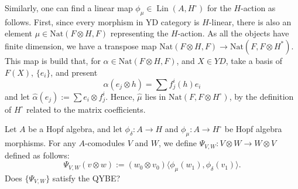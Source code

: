 Similarly, one can find a linear map $\phi_\mu \in \operatorname{Lin}(A, H^\circ)$ for the $H$-action as follows.
First, since every morphism in YD category is $H$-linear, there is also an element $\mu \in \mathrm{Nat}(F \otimes H, F)$ representing the $H$-action.
As all the objects have finite dimension, we have a transpose map $\mathrm{Nat}(F \otimes H, F) \rightarrow \mathrm{Nat}(F, F \otimes H^*)$.
This map is build that, for $\alpha \in \mathrm{Nat}(F \otimes H, F)$, and $X \in YD$, take a basis of $F(X)$, $\{ e_i \}$, and present
\[
\alpha(e_j \otimes h) = \sum  f^i_j (h) e_i
\]
and let $\hat{\alpha}(e_j):= \sum e_i \otimes f^i_j$.
Hence, $\hat{\mu}$ lies in $\mathrm{Nat}(F, F \otimes H^\circ)$, by the definition of $H^\circ$ related to the matrix coefficients.

\begin{question}
    Let $A$ be a Hopf algebra, and let $\phi_\delta: A \rightarrow H$ and $\phi_\mu: A \rightarrow H^\circ$ be Hopf algebra morphisms.
    For any $A$-comodules $V$ and $W$, we define $\Psi_{V,W}: V \otimes W \rightarrow W \otimes V$ defined as follows:
    \[
    \Psi_{V,W}(v \otimes w) := (w_0 \otimes v_0) \langle \phi_\mu(w_1), \phi_\delta(v_1) \rangle.
    \]
    Does $\{ \Psi_{V,W} \}$ satisfy the QYBE?
\end{question}